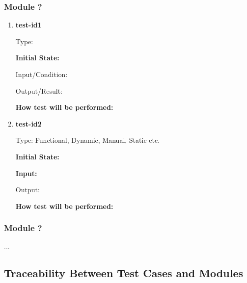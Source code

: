\documentclass[12pt, titlepage]{article}
\begin{document}
\subsubsection{Module ?}
		
\begin{enumerate}

\item \textbf{test-id1\\}

Type: 
					
\textbf{Initial State:} 
					
Input/Condition: 
					
Output/Result: 
					
\textbf{How test will be performed:} 
					
\item \textbf{test-id2\\}

Type: Functional, Dynamic, Manual, Static etc.
					
\textbf{Initial State:} 
					
\textbf{Input:} 
					
Output: 
					
\textbf{How test will be performed:} 

\end{enumerate}

\subsubsection{Module ?}

...

\subsection{Traceability Between Test Cases and Modules}

  



\newpage
\end{document}
